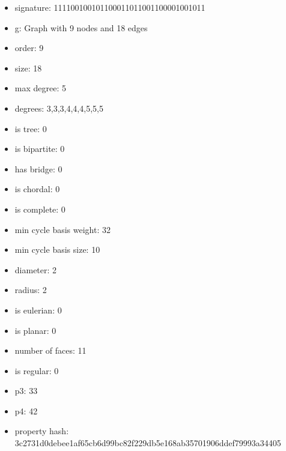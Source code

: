 \newpage
\begin{figure}
\end{figure}
\begin{itemize}
\item signature: 111100100101100011011001100001001011
\item g: Graph with 9 nodes and 18 edges
\item order: 9
\item size: 18
\item max degree: 5
\item degrees: 3,3,3,4,4,4,5,5,5
\item is tree: 0
\item is bipartite: 0
\item has bridge: 0
\item is chordal: 0
\item is complete: 0
\item min cycle basis weight: 32
\item min cycle basis size: 10
\item diameter: 2
\item radius: 2
\item is eulerian: 0
\item is planar: 0
\item number of faces: 11
\item is regular: 0
\item p3: 33
\item p4: 42
\item property hash: 3c2731d0debee1af65cb6d99bc82f229db5e168ab35701906ddef79993a34405
\end{itemize}
